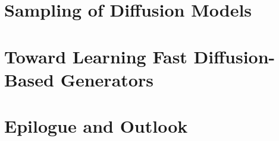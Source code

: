 \documentclass[examplefnt,biber]{nowfnt-arxiv} %
\newtheorem[M]{question}{\sffamily\bfseries Question}[section]
\begin{document}
\part{Sampling of Diffusion Models}




\part{Toward Learning Fast Diffusion-Based Generators}



\part*{Epilogue and Outlook}

% 




\appendix









\backmatter  %




\printbibliography
\end{document}
